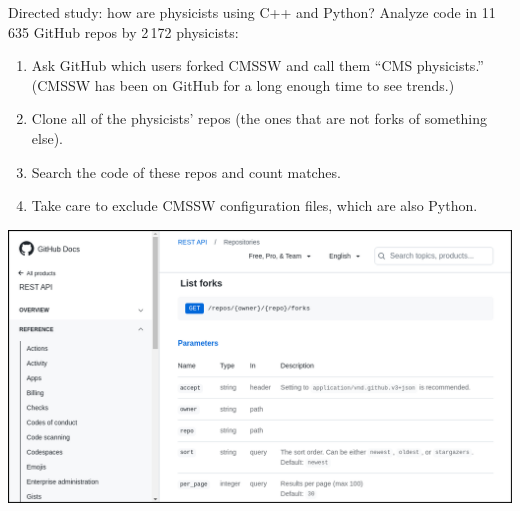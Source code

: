 \documentclass[aspectratio=169]{beamer}
\begin{document}
\begin{frame}{Directed study: how are physicists using C++ and Python?}
\vspace{0.5 cm}
{\Large Analyze code in 11\,635 GitHub repos by 2\,172 physicists:}

\vspace{0.25 cm}
\begin{enumerate}
\item Ask GitHub which users forked CMSSW and call them ``CMS physicists.'' (CMSSW has been on GitHub for a long enough time to see trends.)
\item Clone all of the physicists' repos (the ones that are not forks of something else).
\item Search the code of these repos and count matches.
\item Take care to exclude CMSSW configuration files, which are also Python.
\end{enumerate}

\begin{center}
\includegraphics[width=0.5\linewidth]{github-api-website.png}
\end{center}
\end{frame}
\end{document}
